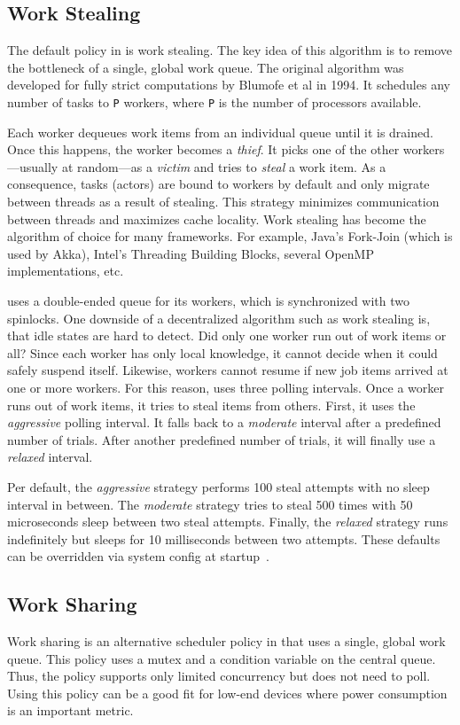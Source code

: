 \subsection{Work Stealing}
\label{work-stealing}

The default policy in \lib is work stealing. The key idea of this algorithm is
to remove the bottleneck of a single, global work queue.  The original
algorithm was developed for fully strict computations by Blumofe et al in 1994.
It schedules any number of tasks to \lstinline^P^ workers, where \lstinline^P^
is the number of processors available.


Each worker dequeues work items from an individual queue until it is drained.
Once this happens, the worker becomes a \emph{thief}. It picks one of the other
workers---usually at random---as a \emph{victim} and tries to \emph{steal} a
work item. As a consequence, tasks (actors) are bound to workers by default and
only migrate between threads as a result of stealing. This strategy minimizes
communication between threads and maximizes cache locality. Work stealing has
become the algorithm of choice for many frameworks. For example, Java's
Fork-Join (which is used by Akka), Intel's Threading Building Blocks, several
OpenMP implementations, etc.

\lib uses a double-ended queue for its workers, which is synchronized with two
spinlocks. One downside of a decentralized algorithm such as work stealing is,
that idle states are hard to detect. Did only one worker run out of work items
or all? Since each worker has only local knowledge, it cannot decide when it
could safely suspend itself. Likewise, workers cannot resume if new job items
arrived at one or more workers. For this reason, \lib uses three polling
intervals. Once a worker runs out of work items, it tries to steal items from
others. First, it uses the \emph{aggressive} polling interval. It falls back to
a \emph{moderate} interval after a predefined number of trials. After another
predefined number of trials, it will finally use a \emph{relaxed} interval.

Per default, the \emph{aggressive} strategy performs 100 steal attempts with no
sleep interval in between. The \emph{moderate} strategy tries to steal 500
times with 50 microseconds sleep between two steal attempts. Finally, the
\emph{relaxed} strategy runs indefinitely but sleeps for 10 milliseconds
between two attempts. These defaults can be overridden via system config at
startup~.

\subsection{Work Sharing}
\label{work-sharing}

Work sharing is an alternative scheduler policy in \lib that uses a single,
global work queue. This policy uses a mutex and a condition variable on the
central queue. Thus, the policy supports only limited concurrency but does not
need to poll. Using this policy can be a good fit for low-end devices where
power consumption is an important metric.

